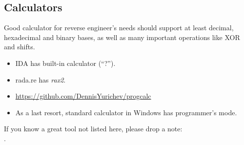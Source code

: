 \subsection{Calculators}

Good calculator for reverse engineer's needs should support at least decimal, hexadecimal and binary bases,
as well as many important operations like XOR and shifts.

\begin{itemize}

\item IDA has built-in calculator (``?'').

\item rada.re has \emph{rax2}.

\item \url{https://github.com/DennisYurichev/progcalc}

\item As a last resort, standard calculator in Windows has programmer's mode.

\end{itemize}


If you know a great tool not listed here, please drop a note:\\
\TT{\EMAIL}.

